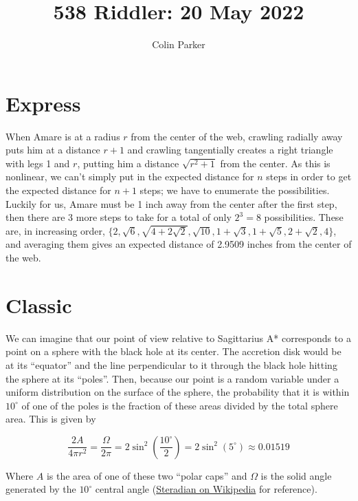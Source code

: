 \documentclass[11pt]{article} %
\title{538 Riddler: 20 May 2022}
\author{Colin Parker}
\begin{document}
\maketitle

\section{Express}

When Amare is at a radius $r$ from the center of the web, crawling radially away puts him at a distance $r + 1$ and
crawling tangentially creates a right triangle with legs 1 and $r$, putting him a distance $\sqrt{r^2 + 1}$ from the
center. As this is nonlinear, we can't simply put in the expected distance for $n$ steps in order to get the
expected distance for $n + 1$ steps; we have to enumerate the possibilities. Luckily for us, Amare must be 1 inch
away from the center after the first step, then there are 3 more steps to take for a total of only $2^3 = 8$ possibilities.
These are, in increasing order, $\{ 2, \sqrt6, \sqrt{4 + 2\sqrt2}, \sqrt{10}, 1 + \sqrt3, 1 + \sqrt5, 2 + \sqrt2, 4 \}$,
and averaging them gives an expected distance of 2.9509 inches from the center of the web. 

\section{Classic}

We can imagine that our point of view relative to Sagittarius A* corresponds to a point on a sphere with the black
hole at its center. The accretion disk would be at its ``equator'' and the line perpendicular to it through the black hole
hitting the sphere at its ``poles''. Then, because our point is a random variable under a uniform distribution on the
surface of the sphere, the probability that it is within $10^{\circ}$ of one of the poles is the fraction of these areas
divided by the total sphere area. This is given by

$$\frac{2A}{4\pi r^2} = \frac{\Omega}{2\pi} = 2\sin^2\left(\frac{10^{\circ}}{2}\right) = 2\sin^2(5^{\circ}) \approx 0.01519$$

Where $A$ is the area of one of these two ``polar caps'' and $\Omega$ is the solid angle generated by the $10^{\circ}$
central angle (\href{https://en.wikipedia.org/wiki/Steradian}{Steradian on Wikipedia} for reference).
\end{document}
